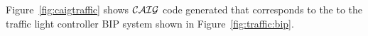 Figure~\ref{fig:caigtraffic} shows $\mathcal{CAIG}$ code generated that corresponds to the  to the traffic light controller BIP system shown in Figure~\ref{fig:traffic:bip}. 

%
%
%
%
%
%
%
%   
%
%    
%    
%              
%              
%    
